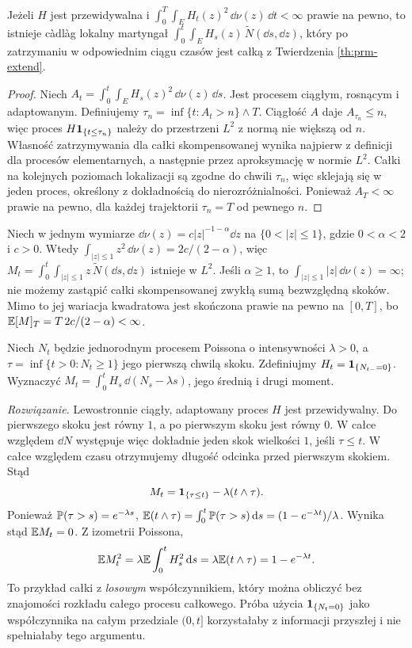 \begin{twierdzenie}
\label{th:prm-local}
Jeżeli $H$ jest przewidywalna i
$\int_0^T\int_EH_t(z)^2\,\dd\nu(z)\,\dd t<\infty$
prawie na pewno, to istnieje càdlàg lokalny martyngał
$\int_0^t\int_EH_s(z)\,\widetilde N(\dd s,\dd z)$,
który po zatrzymaniu w odpowiednim ciągu czasów
jest całką z Twierdzenia \ref{th:prm-extend}.
\end{twierdzenie}
\begin{proof}
Niech $A_t=\int_0^t\int_EH_s(z)^2\,\dd\nu(z)\,\dd s$.
Jest procesem ciągłym, rosnącym i adaptowanym.
Definiujemy $\tau_n=\inf\{t:A_t>n\}\wedge T$.
Ciągłość $A$ daje $A_{\tau_n}\le n$, więc proces
$H\mathbf{1}_{\{t\le\tau_n\}}$ należy do przestrzeni $L^2$
z normą nie większą od $n$. Własność zatrzymywania dla
całki skompensowanej wynika najpierw z definicji dla
procesów elementarnych, a następnie przez aproksymację
w normie $L^2$. Całki na kolejnych poziomach lokalizacji
są zgodne do chwili $\tau_n$, więc sklejają się w jeden
proces, określony z dokładnością do nierozróżnialności.
Ponieważ $A_T<\infty$ prawie na pewno, dla każdej
trajektorii $\tau_n=T$ od pewnego $n$.
\end{proof}

\begin{przyklad}
Niech w jednym wymiarze $\dd\nu(z)=c|z|^{-1-\alpha}\dd z$
na $\{0<|z|\le1\}$, gdzie $0<\alpha<2$ i $c>0$.
Wtedy $\int_{|z|\le1}z^2\,\dd\nu(z)=2c/(2-\alpha)$,
więc $M_t=\int_0^t\int_{|z|\le1}z\,\widetilde N(\dd s,\dd z)$
istnieje w $L^2$. Jeśli $\alpha\ge1$, to
$\int_{|z|\le1}|z|\,\dd\nu(z)=\infty$; nie możemy
zastąpić całki skompensowanej zwykłą sumą bezwzględną
skoków. Mimo to jej wariacja kwadratowa jest skończona
prawie na pewno na $[0,T]$, bo
$\mathbb{E}[M]_T=T\,2c/(2-\alpha)<\infty$.
\end{przyklad}

\begin{zadanie}
Niech $N_t$ będzie jednorodnym procesem Poissona o intensywności
$\lambda>0$, a $\tau=\inf\{t>0:N_t\ge1\}$ jego pierwszą chwilą
skoku. Zdefiniujmy $H_t=\mathbf{1}_{\{N_{t-}=0\}}$.
Wyznaczyć $M_t=\int_0^tH_s\,\dd(N_s-\lambda s)$, jego
średnią i drugi moment.

\emph{Rozwiązanie.} Lewostronnie ciągły, adaptowany proces
$H$ jest przewidywalny. Do pierwszego skoku jest równy $1$,
a po pierwszym skoku jest równy $0$. W całce względem
$\dd N$ występuje więc dokładnie jeden skok wielkości $1$,
jeśli $\tau\le t$. W całce względem czasu otrzymujemy
długość odcinka przed pierwszym skokiem. Stąd
\[
M_t=\mathbf{1}_{\{\tau\le t\}}-\lambda(t\wedge\tau).
\]
Ponieważ $\mathbb{P}(\tau>s)=e^{-\lambda s}$,
$\mathbb{E}(t\wedge\tau)=\int_0^t\mathbb{P}(\tau>s)\,\mathrm{d} s
=(1-e^{-\lambda t})/\lambda$.
Wynika stąd $\mathbb{E} M_t=0$. Z izometrii Poissona,
\[
\mathbb{E} M_t^2=\lambda\mathbb{E}\int_0^tH_s^2\,\mathrm{d} s
=\lambda\mathbb{E}(t\wedge\tau)=1-e^{-\lambda t}.
\]
To przykład całki z \emph{losowym} współczynnikiem,
który można obliczyć bez znajomości rozkładu całego procesu
całkowego. Próba użycia $\mathbf{1}_{\{N_t=0\}}$ jako współczynnika
na całym przedziale $(0,t]$ korzystałaby z informacji
przyszłej i nie spełniałaby tego argumentu.
\end{zadanie}

